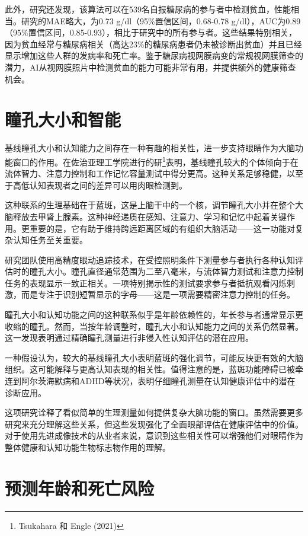 \documentclass[
  Letterpaper,
]{scrbook}
\begin{document}
此外，研究还发现，该算法可以在539名自报糖尿病的参与者中检测贫血，性能相当。研究的MAE略大，为0.73
g/dl（95\%置信区间，0.68-0.78
g/dl），AUC为0.89（95\%置信区间，0.85-0.93），相比于研究中的所有参与者。这些结果特别相关，因为贫血经常与糖尿病相关（高达23\%的糖尿病患者仍未被诊断出贫血）并且已经显示增加这些人群的发病率和死亡率。鉴于糖尿病视网膜病变的常规视网膜筛查的潜力，AI从视网膜照片中检测贫血的能力可能非常有用，并提供额外的健康筛查机会。

\section{瞳孔大小和智能}\label{ux77b3ux5b54ux5927ux5c0fux548cux667aux80fd}

基线瞳孔大小和认知能力之间存在一种有趣的相关性，进一步支持眼睛作为大脑功能窗口的作用。在佐治亚理工学院进行的研\footnote{Tsukahara
  和 Engle (2021)}表明，基线瞳孔较大的个体倾向于在流体智力、注意力控制和工作记忆容量测试中得分更高。这种关系足够稳健，以至于高低认知表现者之间的差异可以用肉眼检测到。

这种联系的生理基础在于蓝斑，这是上脑干中的一个核，调节瞳孔大小并在整个大脑释放去甲肾上腺素。这种神经递质在感知、注意力、学习和记忆中起着关键作用。更重要的是，它有助于维持跨远距离区域的有组织大脑活动------这一功能对复杂认知任务至关重要。

研究团队使用高精度眼动追踪技术，在受控照明条件下测量参与者执行各种认知评估时的瞳孔大小。瞳孔直径通常范围为二至八毫米，与流体智力测试和注意力控制任务的表现显示一致正相关。一项特别揭示性的测试要求参与者抵抗观看闪烁刺激，而是专注于识别短暂显示的字母------这是一项需要精密注意力控制的任务。

瞳孔大小和认知功能之间的这种联系似乎是年龄依赖性的，年长参与者通常显示更收缩的瞳孔。然而，当按年龄调整时，瞳孔大小和认知能力之间的关系仍然显著。这一发现表明通过精确瞳孔测量进行非侵入性认知评估的潜在应用。

一种假设认为，较大的基线瞳孔大小表明蓝斑的强化调节，可能反映更有效的大脑组织。这可能解释与更高认知表现的相关性。值得注意的是，蓝斑功能障碍已被牵连到阿尔茨海默病和ADHD等状况，表明仔细瞳孔测量在认知健康评估中的潜在诊断应用。

这项研究诠释了看似简单的生理测量如何提供复杂大脑功能的窗口。虽然需要更多研究来充分理解这些关系，但这些发现强化了全面眼部评估在健康评估中的价值。对于使用先进成像技术的从业者来说，意识到这些相关性可以增强他们对眼睛作为整体健康和认知功能生物标志物作用的理解。

\section{预测年龄和死亡风险}\label{ux9884ux6d4bux5e74ux9f84ux548cux6b7bux4ea1ux98ceux9669}
\end{document}
